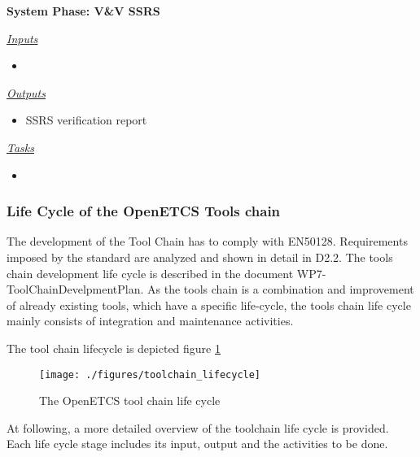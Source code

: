 \documentclass{template/openetcs_article}
\begin{document}
\begin{description}
\item \textbf{System Phase: V\&V SSRS}

\underline{\textit{Inputs}}
\begin{itemize}
\item 
\end{itemize}

\underline{\textit{Outputs}}
\begin{itemize}
\item SSRS verification report
\end{itemize}

\underline{\textit{Tasks}}
\begin{itemize}
\item 
\end{itemize}
\end{description}

\subsubsection{Life Cycle of the OpenETCS Tools chain}
The development of the Tool Chain has to comply with EN50128. Requirements imposed by the standard are analyzed and shown in detail in D2.2. The tools chain development life cycle is described in the document WP7-ToolChainDevelpmentPlan. As the tools chain is a combination and improvement of already existing tools, which have a specific life-cycle, the tools chain life cycle mainly consists of integration and maintenance activities. 

The tool chain lifecycle is depicted figure  \ref{fig:TC_lifecycle}

\begin{figure}[H]
\centering
  \texttt{[image: ./figures/toolchain\_lifecycle]}
  \caption{The OpenETCS tool chain life cycle}
  \label{fig:TC_lifecycle}
\end{figure}

At following, a more detailed overview of the toolchain life cycle is provided. Each life cycle stage includes its input, output and the activities to be done.
\end{document}
